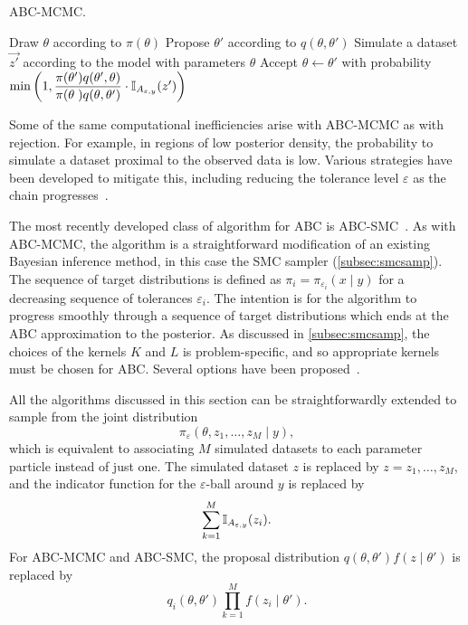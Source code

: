{\begin{algorithm}
  \caption{\gls{ABC}-\gls{MCMC}.}
  \begin{algorithmic}
    \State Draw $\theta$ according to $\pi(\theta)$
    \Loop
      \State Propose $\theta'$ according to $q(\theta, \theta')$
      \State Simulate a dataset $\vec{z'}$ according to the model with
             parameters $\theta$
      \State Accept $\theta \gets \theta'$ with probability
      $\min \left( 1, 
       \dfrac{\pi(\theta') q(\theta', \theta)}
             {\pi(\theta\phantom{'}) q(\theta, \theta')} 
       \cdot \mathbb{I}_{A_{\varepsilon, y}}(z') \right)$
    \EndLoop
  \end{algorithmic}
  \label{alg:abcmcmc}
\end{algorithm}

Some of the same computational inefficiencies arise with \gls{ABC}-\gls{MCMC}
as with rejection. For example, in regions of low posterior density, the
probability to simulate a dataset proximal to the observed data is low. Various
strategies have been developed to mitigate this, including reducing the
tolerance level $\varepsilon$ as the chain
progresses~\autocite{ratmann2007using}.

The most recently developed class of algorithm for \gls{ABC} is
\gls{ABC}-\gls{SMC}~\autocite{sisson2007sequential, beaumont2009adaptive}. As
with \gls{ABC}-\gls{MCMC}, the algorithm is a straightforward modification of
an existing Bayesian inference method, in this case the \gls{SMC} sampler
(\cref{subsec:smcsamp}). The sequence of target distributions is defined as
$\pi_i = \pi_{\varepsilon_i}(x \mid y)$ for a decreasing sequence of tolerances
$\varepsilon_i$. The intention is for the algorithm to progress smoothly
through a sequence of target distributions which ends at the \gls{ABC}
approximation to the posterior. As discussed in \cref{subsec:smcsamp}, the
choices of the kernels $K$ and $L$ is problem-specific, and so appropriate
kernels must be chosen for \gls{ABC}. Several options have been
proposed~\autocite{beaumont2009adaptive, sisson2007sequential,
del2012adaptive}.

All the algorithms discussed in this section can be straightforwardly extended
to sample from the joint distribution
\[
  \pi_\varepsilon(\theta, z_1, \ldots, z_M \mid y),
\]
which is equivalent to associating $M$ simulated datasets to each parameter
particle instead of just one. The simulated dataset $z$ is replaced by
$z = z_1, \ldots, z_M$, and the indicator function for the
$\varepsilon$-ball around $y$ is replaced by
\[
  \sum_{k=1}^M \mathbb{I}_{A_{\varepsilon, y}} (z_i).
\]
For \gls{ABC}-\gls{MCMC} and \gls{ABC}-\gls{SMC}, the proposal distribution
$q(\theta, \theta') f(z \mid \theta')$ is replaced by
\[
  q_i(\theta, \theta') \prod_{k=1}^M f(z_i \mid \theta').
\]

}
